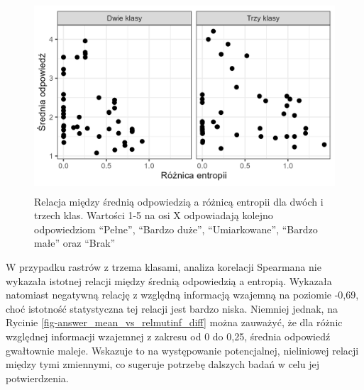 \documentclass{amuthesis}
\begin{document}
\begin{figure}[t]

{\centering \includegraphics[width=4.6875in,height=2.8125in]{figures/answer_mean_vs_ent_diff.png}

}

\caption{\label{fig-answer_mean_vs_ent_diff}Relacja między średnią
odpowiedzią a różnicą entropii dla dwóch i trzech klas. Wartości 1-5 na
osi X odpowiadają kolejno odpowiedziom ``Pełne'', ``Bardzo duże'',
``Umiarkowane'', ``Bardzo małe'' oraz ``Brak''}

\end{figure}

W przypadku rastrów z trzema klasami, analiza korelacji Spearmana nie
wykazała istotnej relacji między średnią odpowiedzią a entropią.
Wykazała natomiast negatywną relację z względną informacją wzajemną na
poziomie -0,69, choć istotność statystyczna tej relacji jest bardzo
niska. Niemniej jednak, na Rycinie
\ref{fig-answer_mean_vs_relmutinf_diff} można zauważyć, że dla różnic
względnej informacji wzajemnej z zakresu od 0 do 0,25, średnia odpowiedź
gwałtownie maleje. Wskazuje to na występowanie potencjalnej, nieliniowej
relacji między tymi zmiennymi, co sugeruje potrzebę dalszych badań w
celu jej potwierdzenia.
\end{document}
